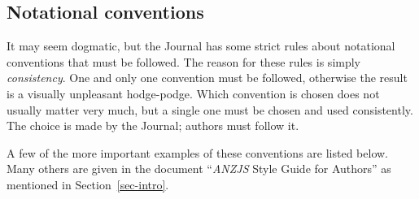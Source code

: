 \documentclass[
doublespace,
  times]{anzsauth}
\begin{document}
\subsection{Notational conventions}\label{sec-noteConv}

It may seem dogmatic, but the Journal has some strict rules about
notational conventions that must be followed. The reason for these rules
is simply \emph{consistency}. One and only one convention must be
followed, otherwise the result is a visually unpleasant hodge-podge.
Which convention is chosen does not usually matter very much, but a
single one must be chosen and used consistently. The choice is made by
the Journal; authors must follow it.

A few of the more important examples of these conventions are listed
below. Many others are given in the document ``\emph{ANZJS} Style Guide
for Authors'' as mentioned in Section~\ref{sec-intro}.
\end{document}
